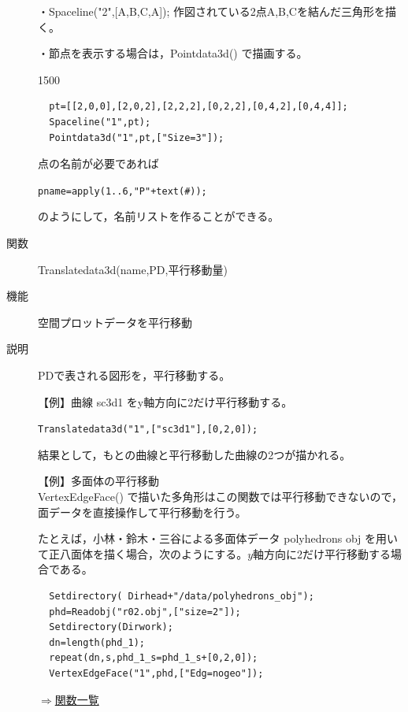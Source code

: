 \documentclass[papersize,a4paper,12pt,uplatex]{jsarticle}
\begin{document}
\begin{description}
・Spaceline("2",[A,B,C,A]);  作図されている2点A,B,Cを結んだ三角形を描く。


・節点を表示する場合は，Pointdata3d() で描画する。

\begin{layer}{150}{0}
\end{layer}
\begin{verbatim}
  pt=[[2,0,0],[2,0,2],[2,2,2],[0,2,2],[0,4,2],[0,4,4]];
  Spaceline("1",pt);
  Pointdata3d("1",pt,["Size=3"]);
\end{verbatim}

点の名前が必要であれば

\verb|pname=apply(1..6,"P"+text(#));|

のようにして，名前リストを作ることができる。

\vspace{\baselineskip}
\hypertarget{translatedata3d}{}
\item[関数]  Translatedata3d(name,PD,平行移動量)
\item[機能]  空間プロットデータを平行移動
\item[説明]  PDで表される図形を，平行移動する。

\vspace{\baselineskip}
【例】曲線 sc3d1 をy軸方向に2だけ平行移動する。

\verb|Translatedata3d("1",["sc3d1"],[0,2,0]);|
    
結果として，もとの曲線と平行移動した曲線の2つが描かれる。

\vspace{\baselineskip}
【例】多面体の平行移動\\
VertexEdgeFace() で描いた多角形はこの関数では平行移動できないので，面データを直接操作して平行移動を行う。
  
たとえば，小林・鈴木・三谷による多面体データ  polyhedrons obj  を用いて正八面体を描く場合，次のようにする。$y$軸方向に2だけ平行移動する場合である。

\begin{verbatim}
  Setdirectory( Dirhead+"/data/polyhedrons_obj");
  phd=Readobj("r02.obj",["size=2"]);
  Setdirectory(Dirwork);
  dn=length(phd_1);
  repeat(dn,s,phd_1_s=phd_1_s+[0,2,0]);
  VertexEdgeFace("1",phd,["Edg=nogeo"]);
\end{verbatim}
      \begin{center}  \end{center}

\begin{flushright} \hyperlink{functionlist}{$\Rightarrow$関数一覧}\end{flushright}


\end{description}
\end{document}
